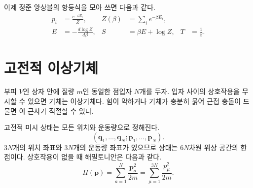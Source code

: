 \begin{classroomqa}\end{classroomqa}

이제 정준 앙상블의 항등식을 모아 쓰면 다음과 같다. \begin{align}
 p_i&=\frac{e^{-\beta E_i}}{Z},&
 Z(\beta)&=\sum_i e^{-\beta E_i},\label{eq:sm4-canonical-pair}\\
 E&=-\frac{d\log Z}{d\beta},&
 S&=\beta E+\log Z,&
 T&=\frac{1}{\beta}.
 \label{eq:sm4-canonical-identities}
\end{align}

\section{고전적 이상기체}

부피 \(V\)인 상자 안에 질량 \(m\)인 동일한 점입자 \(N\)개를 두자. 입자 사이의 상호작용을 무시할 수 있으면 기체는 이상기체다. 힘이 약하거나 기체가 충분히 묽어 근접 충돌이 드물면 이 근사가 적절할 수 있다.

고전적 미시 상태는 모든 위치와 운동량으로 정해진다. \begin{equation}
 (\bm q_1,\ldots,\bm q_N;\bm p_1,\ldots,\bm p_N).
\end{equation}\(3N\)개의 위치 좌표와 \(3N\)개의 운동량 좌표가 있으므로 상태는 \(6N\)차원 위상 공간의 한 점이다. 상호작용이 없을 때 해밀토니안은 다음과 같다. \begin{equation}
 H(\bm p)=\sum_{a=1}^{N}\frac{\bm p_a^2}{2m}
 =\sum_{\mu=1}^{3N}\frac{p_\mu^2}{2m}.
 \label{eq:sm4-ideal-hamiltonian}
\end{equation}

\begin{classroomqa}\end{classroomqa}

